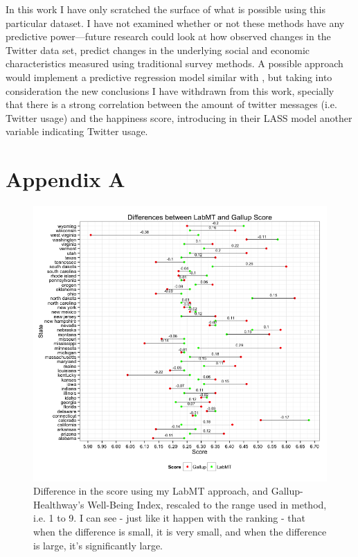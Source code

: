 \documentclass{llncs}
\begin{document}
In this work I have only scratched the surface of what is possible using this particular dataset. I have not examined whether or not these methods have any predictive power—future research could look at how observed changes in the Twitter data set, predict changes in the underlying social and economic characteristics measured using traditional survey methods. A possible approach would implement a predictive regression model similar with \cite{Schwartz2013}, but taking into consideration the new conclusions I have withdrawn from this work, specially that there is a strong correlation between the amount of twitter messages (i.e. Twitter usage) and the happiness score, introducing in their LASS model another variable indicating Twitter usage.




\section*{Appendix A}

\begin{figure}
\centering
\includegraphics[width=\textwidth]{images/differences}
\caption{Difference in the score using my LabMT approach, and Gallup-Healthway's Well-Being Index, rescaled to the range used in \cite{Dodds2009,Dodds2011} method, i.e. 1 to 9. I can see - just like it happen with the ranking - that when the difference is small, it is very small, and when the difference is large, it's significantly large.}
\label{fig:differences}
\end{figure}
\end{document}
